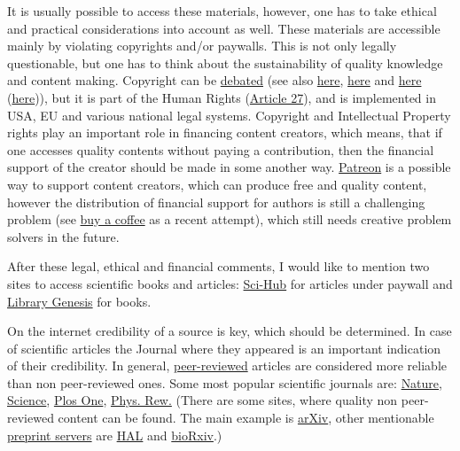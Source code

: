 \documentclass{article}
\begin{document}
It is usually possible to access these materials, however, one has to take ethical and practical considerations into account as well.
These materials are accessible mainly by violating copyrights and/or paywalls. This is not only legally questionable, but one has to think about the sustainability of quality knowledge and content making. Copyright can be \href{https://link.springer.com/chapter/10.1007/978-981-10-3984-3_7}{debated} (see also \href{https://www.youtube.com/watch?v=rFMl0stqai0}{here}, \href{https://en.wikipedia.org/wiki/Criticism_of_copyright}{here} and \href{https://en.wikipedia.org/wiki/Right_to_science_and_culture}{here} (\href{https://www.ted.com/talks/lawrence_lessig_laws_that_choke_creativity}{here})), but it is part of the Human Rights (\href{https://www.humanrights.com/what-are-human-rights/videos/copyright.html}{Article 27}), and is implemented in USA, EU and various national legal systems. Copyright and Intellectual Property rights play an important role in financing content creators, which means, that if one accesses quality contents without paying a contribution, then the financial support of the creator should be made in some another way.
\href{https://www.patreon.com/}{Patreon} is a possible way to support content creators, which can produce free and quality content, however the distribution of financial support for authors is still a challenging problem (see \href{https://ko-fi.com/}{buy a coffee} as a recent attempt), which still needs creative problem solvers in the future.

After these legal, ethical and financial comments, I would like to mention two sites to access scientific books and articles: \href{https://en.wikipedia.org/wiki/Sci-Hub}{Sci-Hub} for articles under paywall and \href{https://en.wikipedia.org/wiki/Library_Genesis}{Library Genesis} for books.

On the internet credibility of a source is key, which should be determined. In case of scientific articles the Journal where they appeared is an important indication of their credibility. In general, \href{https://en.wikipedia.org/wiki/Peer_review}{peer-reviewed} articles are considered more reliable than non peer-reviewed ones. Some most popular scientific journals are: \href{https://www.nature.com/}{Nature}, \href{https://www.sciencemag.org/}{Science}, \href{https://journals.plos.org/plosone/}{Plos One}, \href{https://journals.aps.org/}{Phys. Rew.} (There are some sites, where quality non peer-reviewed content can be found. The main example is \href{https://arxiv.org/}{arXiv}, other mentionable \href{https://en.wikipedia.org/wiki/List_of_preprint_repositories}{preprint servers} are \href{https://hal.archives-ouvertes.fr/}{HAL} and \href{https://www.biorxiv.org/}{bioRxiv}.)
\end{document}
